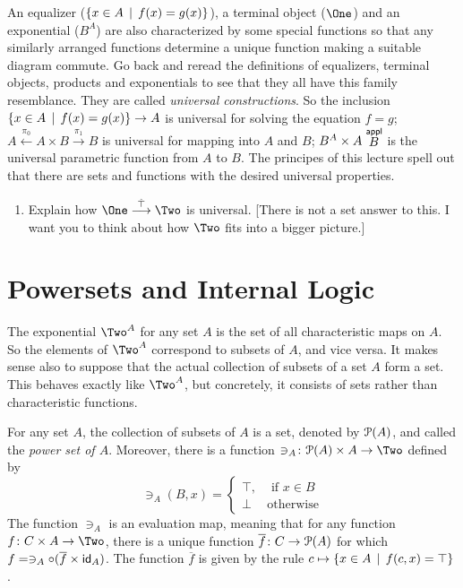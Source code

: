 An equalizer ($\{x\in A\,\mid\, f(x)=g(x)\}$), a terminal object ($\One$) and an exponential ($B^A$) are also characterized by some special functions so that any similarly arranged functions determine a unique function making a suitable diagram commute. Go back and reread the definitions of equalizers, terminal objects, products and exponentials to see that they all have this family resemblance. They are called \emph{universal constructions}. So the inclusion $\{x\in A\,\mid\, f(x)=g(x)\}\to A$ is universal for solving the equation $f=g$; $A\stackrel{\pi_0}{\longleftarrow}A\times B\stackrel{\pi_1}{\longrightarrow}B$ is universal for mapping into $A$ and $B$;
$B^A\times A\stackrel{\mathord{\textsf{appl}}}B$ is the universal parametric function from $A$ to $B$. The principes of this lecture spell out that there are sets and functions 
with the desired universal properties.

\begin{exercises}
	\begin{enumerate}
		\item Explain how $\One\stackrel{\hat{\top}}{\longrightarrow}\Two$ is universal. [There is not a set answer to this. I want you to think about how $\Two$ fits into a bigger picture.]
	\end{enumerate}
\end{exercises}



\chapter{Powersets and Internal Logic}

The exponential $\Two^A$ for any set $A$ is the set of all characteristic maps on $A$.
So the elements of $\Two^A$ correspond to subsets of $A$, and vice versa.
It makes sense also to suppose that the actual collection of subsets of a set $A$ form a set.
This behaves exactly like $\Two^A$, but concretely, it consists of sets rather than characteristic functions.

\begin{principle}\label{ax:powerset}
	For any set $A$, the collection of subsets of $A$ is a set, denoted by ${\mathcal{P}}(A)$, and called the \emph{power set of $A$}. Moreover, there is a function $\fromto {\ni_A}{\powerset(A)\times A}\Two$ defined by 
	\[\ni_A(B,x) = \begin{cases}
		\top, &\text{ if } x\in B\\
		\bot &\text{otherwise}
	\end{cases}
	\]
	The function $\ni_A$ is an evaluation map, meaning that 
	for any function $\fromto f{C\times A}\Two$, there is a unique function ${\overline{f}}\colon{C}\to{{\mathcal{P}}(A)}$ for which $f = \ni_A\circ (\overline{f} \times \textsf{id}_A)$. The function $\overline f$ 
	is given by the rule $c\mapsto \{x\in A\,\mid\, f(c,x)=\top\}$.
\end{principle}

